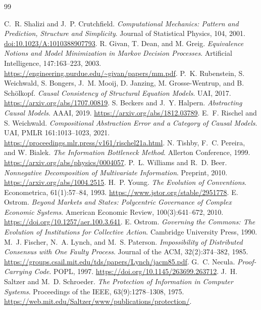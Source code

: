 \documentclass[11pt,letterpaper]{article}
\theoremstyle{plain}
\theoremstyle{definition}
\theoremstyle{remark}
\begin{document}
\clearpage
\begin{thebibliography}{99}
\small
\setlength{\itemsep}{.12em}
\setlength{\parsep}{0pt}
\raggedright
{}
 C.~R. Shalizi and J.~P. Crutchfield. \emph{Computational Mechanics: Pattern and Prediction, Structure and Simplicity}. Journal of Statistical Physics, 104, 2001. \href{https://doi.org/10.1023/A:1010388907793}{doi:10.1023/A:1010388907793}.
 R. Givan, T. Dean, and M. Greig. \emph{Equivalence Notions and Model Minimization in Markov Decision Processes}. Artificial Intelligence, 147:163--223, 2003. \url{https://engineering.purdue.edu/~givan/papers/mm.pdf}.
 P.~K. Rubenstein, S. Weichwald, S. Bongers, J.~M. Mooij, D. Janzing, M. Grosse-Wentrup, and B. Sch\"olkopf. \emph{Causal Consistency of Structural Equation Models}. UAI, 2017. \url{https://arxiv.org/abs/1707.00819}.
 S. Beckers and J.~Y. Halpern. \emph{Abstracting Causal Models}. AAAI, 2019. \url{https://arxiv.org/abs/1812.03789}.
 E.~F. Rischel and S. Weichwald. \emph{Compositional Abstraction Error and a Category of Causal Models}. UAI, PMLR 161:1013--1023, 2021. \url{https://proceedings.mlr.press/v161/rischel21a.html}.
 N. Tishby, F.~C. Pereira, and W. Bialek. \emph{The Information Bottleneck Method}. Allerton Conference, 1999. \url{https://arxiv.org/abs/physics/0004057}.
 P.~L. Williams and R.~D. Beer. \emph{Nonnegative Decomposition of Multivariate Information}. Preprint, 2010. \url{https://arxiv.org/abs/1004.2515}.
 H.~P. Young. \emph{The Evolution of Conventions}. Econometrica, 61(1):57--84, 1993. \url{https://www.jstor.org/stable/2951778}.
 E. Ostrom. \emph{Beyond Markets and States: Polycentric Governance of Complex Economic Systems}. American Economic Review, 100(3):641--672, 2010. \url{https://doi.org/10.1257/aer.100.3.641}.
 E. Ostrom. \emph{Governing the Commons: The Evolution of Institutions for Collective Action}. Cambridge University Press, 1990.
 M.~J. Fischer, N.~A. Lynch, and M.~S. Paterson. \emph{Impossibility of Distributed Consensus with One Faulty Process}. Journal of the ACM, 32(2):374--382, 1985. \url{https://groups.csail.mit.edu/tds/papers/Lynch/jacm85.pdf}.
 G.~C. Necula. \emph{Proof-Carrying Code}. POPL, 1997. \url{https://doi.org/10.1145/263699.263712}.
 J.~H. Saltzer and M.~D. Schroeder. \emph{The Protection of Information in Computer Systems}. Proceedings of the IEEE, 63(9):1278--1308, 1975. \url{https://web.mit.edu/Saltzer/www/publications/protection/}.

\end{thebibliography}
\end{document}
